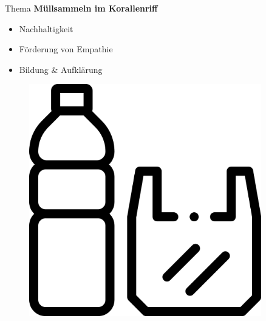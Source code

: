\documentclass{beamer}
\begin{document}
\begin{frame}{Thema}
\textbf{Müllsammeln im Korallenriff}
\begin{minipage}[c]{0.72\textwidth}
\begin{itemize}
\item Nachhaltigkeit
\item Förderung von Empathie
\item Bildung \& Aufklärung
\end{itemize}
\end{minipage}
\hfill
\begin{minipage}[c]{0.25\textwidth}
\begin{figure}
\centering
\includegraphics[width=0.9\textwidth, keepaspectratio]{img/waste}
\caption{\cite{a}}
\end{figure}
\end{minipage}
\end{frame}
\end{document}

